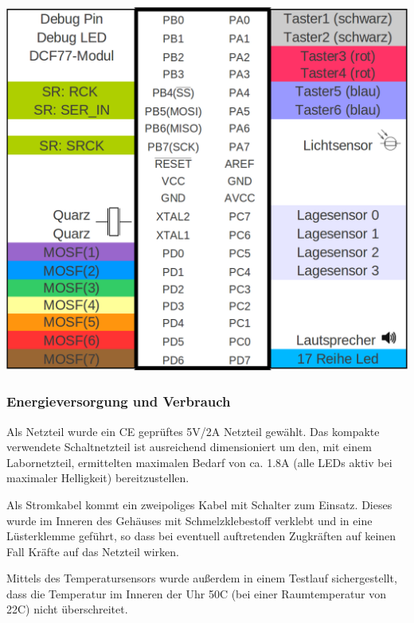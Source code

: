 \begin{center}
\includegraphics[width=.75\textwidth]{skizzen/AVR_Pinbelegung.png}
\label{fig_belegung}
\end{center}

\subsubsection{Energieversorgung und Verbrauch}
Als Netzteil wurde ein CE geprüftes 5V/2A Netzteil gewählt. Das kompakte verwendete Schaltnetzteil ist ausreichend dimensioniert um den, mit einem Labornetzteil, ermittelten maximalen Bedarf von ca. 1.8A (alle LEDs aktiv bei maximaler Helligkeit) bereitzustellen.
 
Als Stromkabel kommt ein zweipoliges Kabel mit Schalter zum Einsatz. Dieses wurde im Inneren des Gehäuses mit Schmelzklebestoff verklebt und in eine Lüsterklemme geführt, so dass bei eventuell auftretenden Zugkräften auf keinen Fall Kräfte auf das Netzteil wirken.

Mittels des Temperatursensors wurde außerdem in einem Testlauf sichergestellt, dass die Temperatur im Inneren der Uhr 50\degree C (bei einer Raumtemperatur von 22\degree C) nicht überschreitet.
%
%
%
